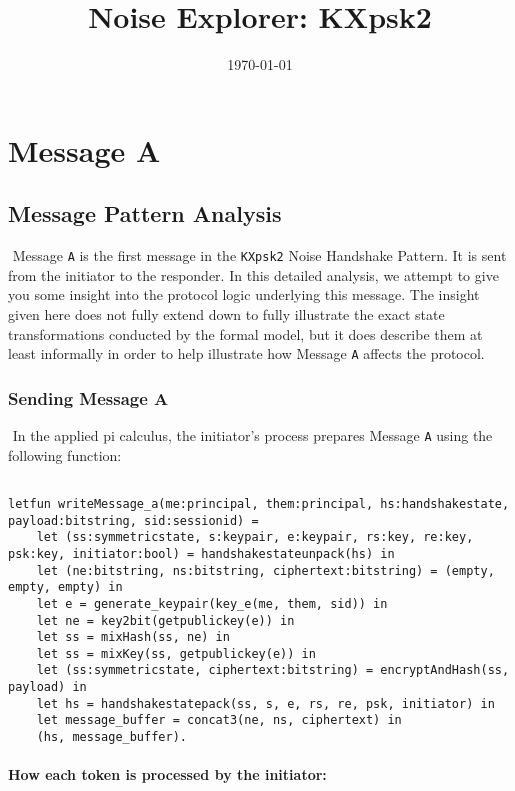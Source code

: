 \title{Noise Explorer: KXpsk2}\date{\today}\maketitle\section{ Message A}

\subsection{Message Pattern Analysis}$ $
Message \texttt{A} is the first message in the \texttt{KXpsk2} Noise Handshake Pattern. It is sent from the initiator to the responder. In this detailed analysis, we attempt to give you some insight into the protocol logic underlying this message. The insight given here does not fully extend down to fully illustrate the exact state transformations conducted by the formal model, but it does describe them at least informally in order to help illustrate how Message \texttt{A} affects the protocol.


\subsubsection{Sending Message A}$ $
In the applied pi calculus, the initiator's process prepares Message \texttt{A} using the following function:


\begin{lstlisting}

letfun writeMessage_a(me:principal, them:principal, hs:handshakestate, payload:bitstring, sid:sessionid) =
	let (ss:symmetricstate, s:keypair, e:keypair, rs:key, re:key, psk:key, initiator:bool) = handshakestateunpack(hs) in
	let (ne:bitstring, ns:bitstring, ciphertext:bitstring) = (empty, empty, empty) in
	let e = generate_keypair(key_e(me, them, sid)) in
	let ne = key2bit(getpublickey(e)) in
	let ss = mixHash(ss, ne) in
	let ss = mixKey(ss, getpublickey(e)) in
	let (ss:symmetricstate, ciphertext:bitstring) = encryptAndHash(ss, payload) in
	let hs = handshakestatepack(ss, s, e, rs, re, psk, initiator) in
	let message_buffer = concat3(ne, ns, ciphertext) in
	(hs, message_buffer).

\end{lstlisting}

\paragraph{How each token is processed by the initiator:}$ $

